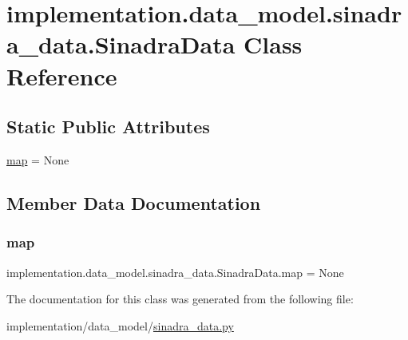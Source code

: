 \hypertarget{classimplementation_1_1data__model_1_1sinadra__data_1_1_sinadra_data}{}\section{implementation.\+data\+\_\+model.\+sinadra\+\_\+data.\+Sinadra\+Data Class Reference}
\label{classimplementation_1_1data__model_1_1sinadra__data_1_1_sinadra_data}
\subsection*{Static Public Attributes}
\begin{DoxyCompactItemize}
\item 
\hyperlink{classimplementation_1_1data__model_1_1sinadra__data_1_1_sinadra_data_a2a341561acc7ed85911c4432c2282821}{map} = None
\end{DoxyCompactItemize}


\subsection{Member Data Documentation}
\mbox{\label{classimplementation_1_1data__model_1_1sinadra__data_1_1_sinadra_data_a2a341561acc7ed85911c4432c2282821}} 
\subsubsection{\texorpdfstring{map}{map}}
{\footnotesize\ttfamily implementation.\+data\+\_\+model.\+sinadra\+\_\+data.\+Sinadra\+Data.\+map = None\hspace{0.3cm}{\ttfamily [static]}}



The documentation for this class was generated from the following file\+:\begin{DoxyCompactItemize}
\item 
implementation/data\+\_\+model/\hyperlink{sinadra__data_8py}{sinadra\+\_\+data.\+py}\end{DoxyCompactItemize}
